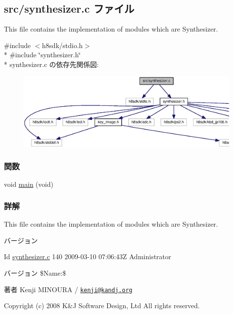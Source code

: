\subsection{src/synthesizer.c ファイル}
\label{synthesizer_8c}


This file contains the implementation of modules which are Synthesizer.  


{\ttfamily \#include $<$h8sdk/stdio.\+h$>$}\\*
{\ttfamily \#include \char`\"{}synthesizer.\+h\char`\"{}}\\*
synthesizer.\+c の依存先関係図\+:
\nopagebreak
\begin{figure}[H]
\begin{center}
\leavevmode
\includegraphics[width=350pt]{dc/d72/synthesizer_8c__incl}
\end{center}
\end{figure}
\subsubsection*{関数}
\begin{DoxyCompactItemize}
\item 
void \hyperlink{synthesizer_8c_a6288eba0f8e8ad3ab1544ad731eb7667_a6288eba0f8e8ad3ab1544ad731eb7667}{main} (void)
\end{DoxyCompactItemize}


\subsubsection{詳解}
This file contains the implementation of modules which are Synthesizer. 

\begin{DoxyVersion}{バージョン}

\end{DoxyVersion}
\begin{DoxyParagraph}{Id}
\hyperlink{synthesizer_8c}{synthesizer.\+c} 140 2009-\/03-\/10 07\+:06\+:43\+Z Administrator 
\end{DoxyParagraph}
\begin{DoxyVersion}{バージョン}
\$\+Name\+:\$
\end{DoxyVersion}
\begin{DoxyAuthor}{著者}
Kenji M\+I\+N\+O\+U\+R\+A / \href{mailto:kenji@kandj.org}{\tt kenji@kandj.\+org}
\end{DoxyAuthor}
Copyright (c) 2008 K\&J Software Design, Ltd All rights reserved.

